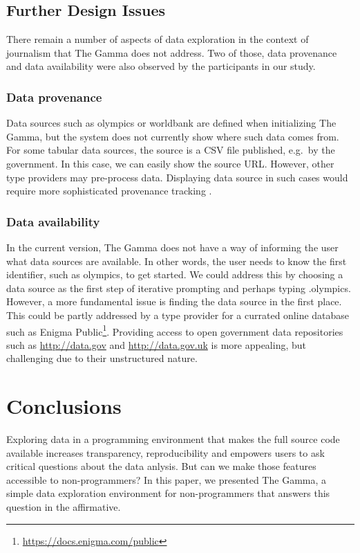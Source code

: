 \documentclass[manuscript,review,anonymous]{acmart}
\newcommand{\ikvd}[1]{{\fontfamily{zi4}\selectfont\small #1}}
\begin{document}
\subsection{Further Design Issues}
There remain a number of aspects of data exploration in the context of journalism that
The Gamma does not address. Two of those, data provenance and data availability were also
observed by the participants in our study.

\subsubsection*{Data provenance}
Data sources such as \ikvd{olympics} or \ikvd{worldbank} are defined when initializing The Gamma,
but the system does not currently show where such data comes from.
For some tabular data sources, the source is a CSV file published, e.g.~by the government. In this case,
we can easily show the source URL. However, other type providers may pre-process data. Displaying
data source in such cases would require more sophisticated provenance tracking \cite{provenance}.

\subsubsection*{Data availability}
In the current version, The Gamma does not have a way of informing the user what data sources
are available. In other words, the user needs to know the first identifier, such as \ikvd{olympics},
to get started. We could address this by choosing a data source as the first step of iterative
prompting and perhaps typing \ikvd{.olympics}. However, a more fundamental issue is finding
the data source in the first place. This could be partly addressed by a type provider for a
currated online database such as Enigma Public\footnote{\url{https://docs.enigma.com/public}}.
Providing access to open government data repositories such as \url{http://data.gov} and
\url{http://data.gov.uk} is more appealing, but challenging due to their unstructured nature.

\section{Conclusions}
Exploring data in a programming environment that makes the full source code available increases
transparency, reproducibility and empowers users to ask critical questions about the data anlysis.
But can we make those features accessible to non-programmers? In this paper, we presented The Gamma,
a simple data exploration environment for non-programmers that answers this question in the
affirmative.
\end{document}
